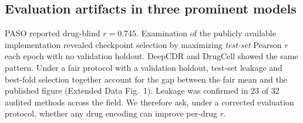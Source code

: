 \subsection*{Evaluation artifacts in three prominent models}

PASO\cite{wu2025paso} reported drug-blind $r = 0.745$. Examination of the publicly available implementation revealed checkpoint selection by maximizing \emph{test-set} Pearson $r$ each epoch with no validation holdout. DeepCDR\cite{liu2020deepcdr} and DrugCell\cite{kuenzi2020predicting} showed the same pattern. Under a fair protocol with a validation holdout, test-set leakage and best-fold selection together account for the gap between the fair mean and the published figure (Extended Data Fig.~1). Leakage was confirmed in 23 of 32 audited methods across the field\cite{asiaee2026widespread}. We therefore ask, under a corrected evaluation protocol, whether any drug encoding can improve per-drug $r$.
